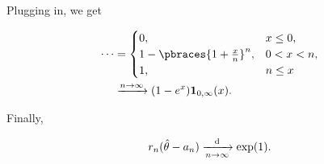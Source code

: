 \begin{solution}
\begin{enumerate}[label = (\alph*)]
    Plugging in, we get

    \begin{align*}
        \cdots
        & =
        \begin{cases}
            0,
            & x \leq 0, \\
            1 - \pbraces{1 + \frac{x}{n}}^n,
            & 0 < x < n, \\
            1,
            & n \leq x
        \end{cases} \\
        & \xrightarrow{n \to \infty}
        (1 - e^x) \mathbf 1_{0, \infty}(x).
    \end{align*}

    Finally,

    \begin{align*}
        r_n (\hat \theta - a_n)
        \xrightarrow[n \to \infty]{\text d}
        \exp(1).
    \end{align*}

\end{enumerate}

\end{solution}

